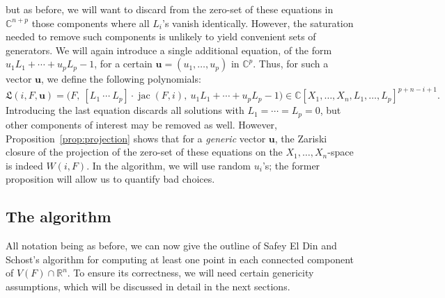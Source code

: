 \documentclass[12pt]{article}
\def\frkL{\mathfrak{L}}
\def\Xb{\textit{\textbf{X}}}
\def\ub{{\bm u}}
\DeclareMathOperator{\jac}{jac}
\def\C{\mathbb{C}}
\def\R{\mathbb{R}}
\def\la{\langle}
\def\ra{\rangle}
\newtheorem{ex}[theorem]{Example}
\begin{document}
but as before, we will want to discard from the zero-set of these
equations in $\C^{n+p}$ those components where all $L_i$'s vanish
identically. However, the saturation needed to remove such components
is unlikely to yield convenient sets of generators.  We will again
introduce a single additional equation, of the form $u_1 L_1 + \cdots
+ u_p L_p -1$, for a certain $\bm u = (u_1,\dots,u_p)$ in
$\C^p$. Thus, for such a vector $\ub$, we define the following
polynomials:
\begin{equation}\label{eqdef:Iil}
\frkL(i,F,\bm u)= 
\big (F,\ [L_1~\cdots~L_p]\cdot \jac(F, i),\ u_1 L_1 + \cdots + u_p L_p -1 \big )
\in \C[X_1,\dots,X_n,L_1,\dots,L_p]^{p+n-i+1}.
\end{equation}
Introducing the last equation discards all solutions with $L_1 =
\cdots = L_p =0$, but other components of interest may be removed as
well. However, Proposition~\ref{prop:projection} shows that for a {\em
  generic} vector $\bm u$, the Zariski closure of the projection of
the zero-set of these equations on the $X_1,\dots,X_n$-space is indeed
$W(i,F)$.  In the algorithm, we will use random $u_i$'s; the former
proposition will allow us to quantify bad choices.



\subsection{The algorithm}\label{ssec:algo}

All notation being as before, we can now give the outline of Safey El
Din and Schost's algorithm for computing at least one point in each
connected component of $V(F) \cap\R^n$. To ensure its correctness, we
will need certain genericity assumptions, which will be discussed in
detail in the next sections.
\end{document}
